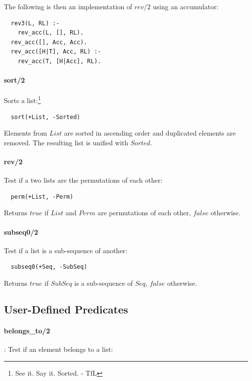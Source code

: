 \documentclass{article}
\begin{document}
\begin{multicols}{2}
  The following is then an implementation of $rev/2$ using an accumulator:
  
  \begin{lstlisting}
  rev3(L, RL) :-
    rev_acc(L, [], RL).
  rev_acc([], Acc, Acc).
  rev_acc([H|T], Acc, RL) :-
    rev_acc(T, [H|Acc], RL).
  \end{lstlisting}
  
  \paragraph{sort/2} Sorts a list:\footnote{See it. Say it. Sorted. - TfL}
  
  \begin{lstlisting}
  sort(+List, -Sorted)
  \end{lstlisting} 
  
  Elements from $List$ are sorted in ascending order and duplicated elements are removed. The resulting list is unified with $Sorted$.
  
  \paragraph{rev/2} Test if a two lists are the permutations of each other:
  
  \begin{lstlisting}
  perm(+List, -Perm)
  \end{lstlisting} 
  
  Returns $true$ if $List$ and $Perm$ are permutations of each other, $false$ otherwise.
  
  \paragraph{subseq0/2} Test if a list is a sub-sequence of another:
  
  \begin{lstlisting}
  subseq0(+Seq, -SubSeq)
  \end{lstlisting} 
  
  Returns $true$ if $SubSeq$ is a sub-sequence of $Seq$, $false$ otherwise.
  
  \subsection{User-Defined Predicates}

  \paragraph{belongs\_to/2}: Test if an element belongs to a list:
  

\end{multicols}
\end{document}
